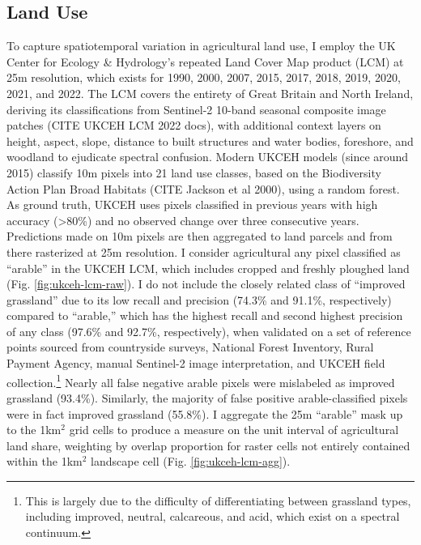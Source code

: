 \subsection{Land Use}
To capture spatiotemporal variation in agricultural land use, I employ the UK Center for Ecology \& Hydrology's repeated Land Cover Map product (LCM) at 25m resolution, which exists for 1990, 2000, 2007, 2015, 2017, 2018, 2019, 2020, 2021, and 2022. The LCM covers the entirety of Great Britain and North Ireland, deriving its classifications from Sentinel-2 10-band seasonal composite image patches (CITE UKCEH LCM 2022 docs), with additional context layers on height, aspect, slope, distance to built structures and water bodies, foreshore, and woodland to ejudicate spectral confusion. Modern UKCEH models (since around 2015) classify 10m pixels into 21 land use classes, based on the Biodiversity Action Plan Broad Habitats (CITE Jackson et al 2000), using a random forest. As ground truth, UKCEH uses pixels classified in previous years with high accuracy (>80\%) and no observed change over three consecutive years. Predictions made on 10m pixels are then aggregated to land parcels and from there rasterized at 25m resolution. I consider agricultural any pixel classified as ``arable'' in the UKCEH LCM, which includes cropped and freshly ploughed land (Fig. \ref{fig:ukceh-lcm-raw}). I do not include the closely related class of ``improved grassland'' due to its low recall and precision (74.3\% and 91.1\%, respectively) compared to ``arable,'' which has the highest recall and second highest precision of any class (97.6\% and 92.7\%, respectively), when validated on a set of reference points sourced from countryside surveys, National Forest Inventory, Rural Payment Agency, manual Sentinel-2 image interpretation, and UKCEH field collection.\footnote{This is largely due to the difficulty of differentiating between grassland types, including improved, neutral, calcareous, and acid, which exist on a spectral continuum.} Nearly all false negative arable pixels were mislabeled as improved grassland (93.4\%). Similarly, the majority of false positive arable-classified pixels were in fact improved grassland (55.8\%). I aggregate the 25m ``arable'' mask up to the 1km$^2$ grid cells to produce a measure on the unit interval of agricultural land share, weighting by overlap proportion for raster cells not entirely contained within the 1km$^2$ landscape cell (Fig. \ref{fig:ukceh-lcm-agg}). 


